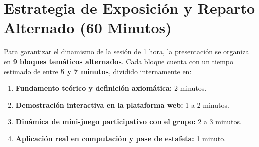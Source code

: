 \documentclass[11pt,a4paper]{article}
\begin{document}
\newpage
\tableofcontents
\newpage

\section{Estrategia de Exposición y Reparto Alternado (60 Minutos)}

Para garantizar el dinamismo de la sesión de 1 hora, la presentación se organiza en \textbf{9 bloques temáticos alternados}. Cada bloque cuenta con un tiempo estimado de entre \textbf{5 y 7 minutos}, dividido internamente en:
\begin{enumerate}[noitemsep]
  \item \textbf{Fundamento teórico y definición axiomática:} 2 minutos.
  \item \textbf{Demostración interactiva en la plataforma web:} 1 a 2 minutos.
  \item \textbf{Dinámica de mini-juego participativo con el grupo:} 2 a 3 minutos.
  \item \textbf{Aplicación real en computación y pase de estafeta:} 1 minuto.
\end{enumerate}
\end{document}
